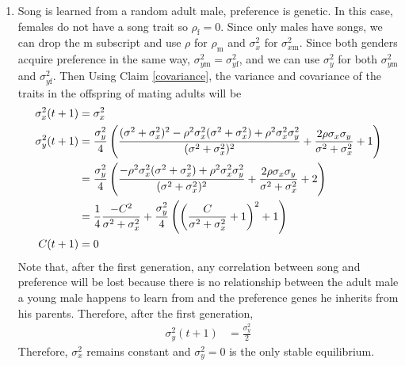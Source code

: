 \documentclass{article}
\newcommand{\x}[1]{\text{#1}}
\begin{document}
\begin{enumerate}
\item Song is learned from a random adult male, preference is genetic. In this case, females do not have a song trait so $\rho_\x{f}=0$. Since only males have songs, we can drop the m subscript and use $\rho$ for $\rho_\x{m}$ and $\sigma_x^2$ for $\sigma_{x\x{m}}^2$. Since both genders acquire preference in the same way, $\sigma_{y\x{m}}^2=\sigma_{y\x{f}}^2$, and we can use $\sigma_y^2$ for both $\sigma_{y\x{m}}^2$ and $\sigma_{y\x{f}}^2$. Then Using Claim \ref{covariance}, the variance and covariance of the traits in the offspring of mating adults will be 
\begin{align*}
\sigma_x^2(t+1)&=\sigma_x^2 %
\\ \sigma_y^2(t+1)&=\frac{\sigma_y^2}{4}\left(\frac{(\sigma^2+\sigma_x^2)^2-\rho^2\sigma_x^2(\sigma^2+\sigma_x^2)+\rho^2\sigma_x^2\sigma_y^2}{(\sigma^2+\sigma_x^2)^2}+\frac{2\rho\sigma_x\sigma_y}{\sigma^2+\sigma_x^2}+1\right) \notag
\\&=\frac{\sigma_y^2}{4}\left(\frac{-\rho^2\sigma_x^2(\sigma^2+\sigma_x^2)+\rho^2\sigma_x^2\sigma_y^2}{(\sigma^2+\sigma_x^2)^2}+\frac{2\rho\sigma_x\sigma_y}{\sigma^2+\sigma_x^2}+2\right)  \notag
\\&=\frac{1}{4}\frac{-C^2}{\sigma^2+\sigma_x^2}+\frac{\sigma_y^2}{4}\left(\left(\frac{C}{\sigma^2+\sigma_x^2}+1\right)^2+1\right) %
\\ C(t+1)&=0
\end{align*}
Note that, after the first generation, any correlation between song and preference will be lost because there is no relationship between the adult male a young male happens to learn from and the preference genes he inherits from his parents. Therefore, after the first generation,
\begin{align*}
\sigma_y^2(t+1)&=\frac{\sigma_y^2}{2}
\end{align*}
Therefore, $\sigma_x^2$ remains constant and $\sigma_y^2=0$ is the only stable equilibrium.


\end{enumerate}
\end{document}
